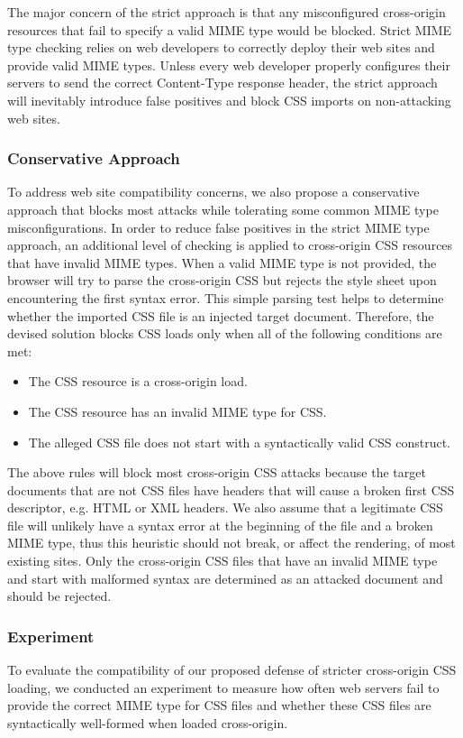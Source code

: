 \documentclass{acm_proc_article-sp}
\begin{document}
The major concern of the strict approach is that any misconfigured cross-origin resources that fail to specify a valid MIME type would be blocked. Strict MIME type checking relies on web developers to correctly deploy their web sites and provide valid MIME types. Unless every web developer properly configures their servers to send the correct Content-Type response header, the strict approach will inevitably introduce false positives and block CSS imports on non-attacking web sites.

\subsubsection{Conservative Approach}
To address web site compatibility concerns, we also propose a conservative approach that blocks most attacks while tolerating some common MIME type misconfigurations. In order to reduce false positives in the strict MIME type approach, an additional level of checking is applied to cross-origin CSS resources that have invalid MIME types. When a valid MIME type is not provided, the browser will try to parse the cross-origin CSS but rejects the style sheet upon encountering the first syntax error. This simple parsing test helps to determine whether the imported CSS file is an injected target document. Therefore, the devised solution blocks CSS loads only when all of the following conditions are met:
\begin{itemize}
\item{The CSS resource is a cross-origin load.}
\item{The CSS resource has an invalid MIME type for CSS.}
\item{The alleged CSS file does not start with a syntactically valid CSS construct.}
\end{itemize}
The above rules will block most cross-origin CSS attacks because the target documents that are not CSS files have headers that will cause a broken first CSS descriptor, e.g. HTML or XML headers. We also assume that a legitimate CSS file will unlikely have a syntax error at the beginning of the file and a broken MIME type, thus this heuristic should not break, or affect the rendering, of most existing sites. Only the cross-origin CSS files that have an invalid MIME type and start with malformed syntax are determined as an attacked document and should be rejected.

\subsubsection{Experiment}
To evaluate the compatibility of our proposed defense of stricter cross-origin CSS loading, we conducted an experiment to measure how often web servers fail to provide the correct MIME type for CSS files and whether these CSS files are syntactically well-formed when loaded cross-origin.
\end{document}
